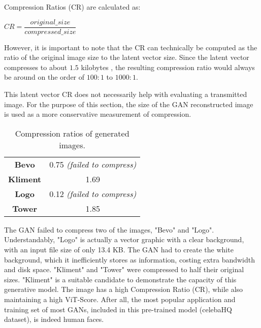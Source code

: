 Compression Ratios (CR) are calculated as:
\begin{center}
	$ \displaystyle CR = \dfrac{original\_size}{compressed\_size}$
	\end{center}

However, it is important to note that the CR can technically be computed as the ratio of 
the original image size to the latent vector size.
Since the latent vector compresses to about $1.5$ kilobytes , 
the resulting compression ratio would always be around on the order of $100:1$ to $1000:1$.

This latent vector CR does not necessarily help with evaluating a transmitted image. 
For the purpose of this section, the size of the GAN reconstructed image is used as a more
conservative measurement of compression. 

\vspace{2mm}


\vspace{1mm}

\begin{table}[H]
\begin{center}
\begin{tabular}{|c|c|}
\hline
\textbf{Bevo}	& 0.75 \textit{(failed to compress)}\\
\textbf{Kliment}	& 1.69\\
\textbf{Logo}	& 0.12 \textit{(failed to compress)}\\
\textbf{Tower} & 1.85\\\hline

\end{tabular}
\caption[Results: Compression Ratios]{Compression ratios of generated images.}
\end{center}
\end{table}

The GAN failed to compress two of the images, "Bevo" and "Logo". 
Understandably, "Logo" is actually a vector graphic with a clear background, with an input file size of only 13.4 KB.
The GAN had to create the white background, which it inefficiently stores as information, costing extra 
bandwidth and disk space.
"Kliment" and "Tower" were compressed to half their original sizes. 
"Kliment" is a suitable candidate to demonstrate the capacity of this generative model.
The image has a high Compression Ratio (CR), while also maintaining a high ViT-Score.
After all, the most popular application and training set of most GANs, included in this pre-trained model (celebaHQ dataset),
is indeed human faces.


